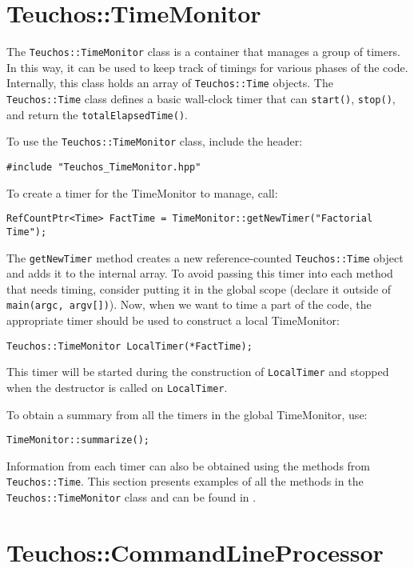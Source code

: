 
\section{Teuchos::TimeMonitor}
\label{sec:teuchos:TimeMonitor}

The \verb!Teuchos::TimeMonitor! class is a container that manages a
group of timers.  In this way, it can be used to keep track of timings
for various phases of the code.  Internally, this class holds an array 
of \verb!Teuchos::Time! objects.  The 
\verb!Teuchos::Time! class defines a basic wall-clock timer that can 
\verb!start()!, \verb!stop()!, and return the \verb!totalElapsedTime()!.

To use the \verb!Teuchos::TimeMonitor! class, include the header:
{\small 
\begin{verbatim}
#include "Teuchos_TimeMonitor.hpp"
\end{verbatim}}
To create a timer for the TimeMonitor to manage, call:
{\small 
\begin{verbatim}
RefCountPtr<Time> FactTime = TimeMonitor::getNewTimer("Factorial Time");
\end{verbatim}}
\noindent The {\tt getNewTimer} method creates a new reference-counted
{\tt Teuchos::Time} object and adds it to the internal array.  To avoid
passing this timer into each method that needs timing, consider putting it in the
global scope (declare it outside of {\tt main(argc, argv[])}).  Now, when 
we want to time a part of the code, the appropriate timer should be used to 
construct a local TimeMonitor:
{\small
\begin{verbatim}
Teuchos::TimeMonitor LocalTimer(*FactTime);
\end{verbatim}}
\noindent This timer will be started during the construction of {\tt LocalTimer}
and stopped when the destructor is called on {\tt LocalTimer}.

To obtain a summary from all the timers in the global TimeMonitor, use:
{\small
\begin{verbatim}
TimeMonitor::summarize();
\end{verbatim}}
\noindent Information from each timer can also be obtained using 
the methods from {\tt Teuchos::Time}.  
This section presents examples of all the 
methods in the {\tt Teuchos::TimeMonitor} class and can be found in
.  


\section{Teuchos::CommandLineProcessor}
\label{sec:teuchos:CLP}

